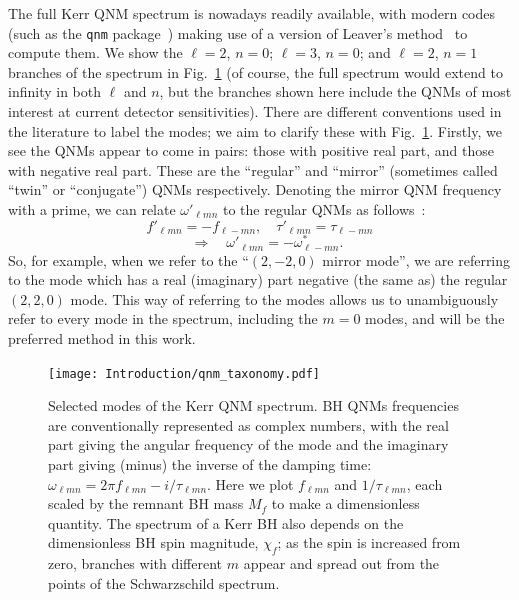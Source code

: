 The full Kerr QNM spectrum is nowadays readily available, with modern codes (such as the \texttt{qnm} package~\cite{Stein:2019mop}) making use of a version of Leaver's method~\cite{Leaver:1985ax} to compute them.
We show the $\ell = 2$, $n = 0$; $\ell = 3$, $n = 0$; and $\ell = 2$, $n = 1$ branches of the spectrum in Fig.~\ref{fig:ch1:qnm_taxonomy} (of course, the full spectrum would extend to infinity in both $\ell$ and $n$, but the branches shown here include the QNMs of most interest at current detector sensitivities).  
There are different conventions used in the literature to label the modes; we aim to clarify these with Fig.~\ref{fig:ch1:qnm_taxonomy}.
Firstly, we see the QNMs appear to come in pairs: those with positive real part, and those with negative real part.
These are the ``regular'' and ``mirror'' (sometimes called ``twin'' or ``conjugate'') QNMs respectively.
Denoting the mirror QNM frequency with a prime, we can relate $\omega'_{\ell m n}$ to the regular QNMs as follows~\cite{Berti:2005ys}:
\begin{equation}
    f'_{\ell m n} = -f_{\ell -m n}, \quad \tau'_{\ell m n} = \tau_{\ell -m n} \nonumber
\end{equation}
\begin{equation} 
    \quad\Rightarrow\quad \omega'_{\ell m n} = - \omega_{\ell -mn}^*.
    \label{eq:ch1:sym_mirror_modes_conj}
\end{equation}
So, for example, when we refer to the ``$(2,-2,0)$ mirror mode'', we are referring to the mode which has a real (imaginary) part negative (the same as) the regular $(2,2,0)$ mode.
This way of referring to the modes allows us to unambiguously refer to every mode in the spectrum, including the $m=0$ modes, and will be the preferred method in this work.

\begin{figure}[t]
	\centering
	\texttt{[image: Introduction/qnm\_taxonomy.pdf]}
	\caption[The Kerr quasinormal mode spectrum]{ 
		Selected modes of the Kerr QNM spectrum. BH QNMs frequencies are conventionally represented as complex numbers, with the real part giving the  angular frequency of the mode and the imaginary part giving (minus) the inverse of the damping time: $\omega_{\ell m n} = 2\pi f_{\ell m n} - i/\tau_{\ell m n}$. Here we plot $f_{\ell m n}$ and $1/\tau_{\ell m n}$, each scaled by the remnant BH mass $M_f$ to make a dimensionless quantity. The spectrum of a Kerr BH also depends on the dimensionless BH spin magnitude, $\chi_f$; as the spin is increased from zero, branches with different $m$ appear and spread out from the points of the Schwarzschild spectrum.
        }
	\label{fig:ch1:qnm_taxonomy}
\end{figure}

